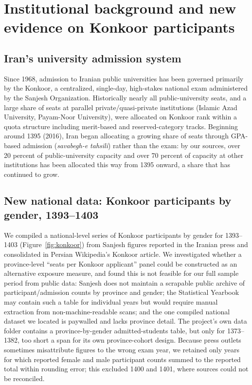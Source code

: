 \documentclass[11pt]{article}
\begin{document}
\section{Institutional background and new evidence on Konkoor participants}

\subsection{Iran's university admission system}

Since 1968, admission to Iranian public universities has been governed primarily by the Konkoor, a centralized, single-day, high-stakes national exam administered by the Sanjesh Organization. Historically nearly all public-university seats, and a large share of seats at parallel private/quasi-private institutions (Islamic Azad University, Payam-Noor University), were allocated on Konkoor rank within a quota structure including merit-based and reserved-category tracks. Beginning around 1395 (2016), Iran began allocating a growing share of seats through GPA-based admission (\emph{savabegh-e tahsili}) rather than the exam: by our sources, over 20 percent of public-university capacity and over 70 percent of capacity at other institutions has been allocated this way from 1395 onward, a share that has continued to grow.

\subsection{New national data: Konkoor participants by gender, 1393--1403}

We compiled a national-level series of Konkoor participants by gender for 1393--1403 (Figure~\ref{fig:konkoor}) from Sanjesh figures reported in the Iranian press and consolidated in Persian Wikipedia's Konkoor article. We investigated whether a province-level ``seats per Konkoor applicant'' panel could be constructed as an alternative exposure measure, and found this is not feasible for our full sample period from public data: Sanjesh does not maintain a scrapable public archive of participant/admission counts by province and gender; the Statistical Yearbook may contain such a table for individual years but would require manual extraction from non-machine-readable scans; and the one compiled national dataset we located is paywalled and lacks province detail. The project's own data folder contains a province-by-gender admitted-students table, but only for 1373--1382, too short a span for its own province-cohort design. Because press outlets sometimes misattribute figures to the wrong exam year, we retained only years for which reported female and male participant counts summed to the reported total within rounding error; this excluded 1400 and 1401, where sources could not be reconciled.
\end{document}
